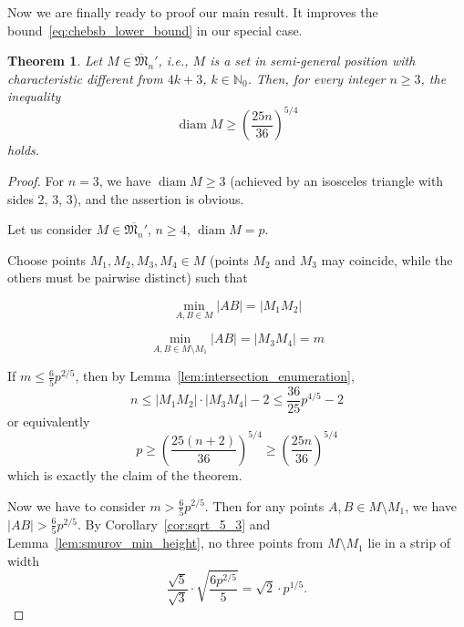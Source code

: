 \documentclass[a4paper,14pt]{article} %
\theoremstyle{plain}
\newtheorem{theorem}{Theorem}[section]
\theoremstyle{definition}
\begin{document}
Now we are finally ready to proof our main result.
It improves the bound~\eqref{eq:chebsb_lower_bound}
in our special case.

\begin{theorem}
	\label{thm:main_result}
	Let $M \in \overline{\mathfrak{M}}_n'$, i.e., $M$ is a set in semi-general position with characteristic different from $4k+3$, $k \in \mathbb{N}_0$.
	Then, for every integer $n \geq 3$, the inequality
	\begin{equation}
		\operatorname{diam} M \geq \left( \frac{25n}{36} \right)^{5/4}
	\end{equation}
	holds.
\end{theorem}

\begin{proof}
	For $n = 3$, we have $\operatorname{diam} M \geq 3$ (achieved by an isosceles triangle with sides 2, 3, 3), and the assertion is obvious.

	Let us consider $M \in \overline{\mathfrak{M}_n}'$, $n \geq 4$, $\operatorname{diam} M = p$.

	Choose points $M_1, M_2, M_3, M_4 \in M$ (points $M_2$ and $M_3$ may coincide, while the others must be pairwise distinct) such that

	\begin{equation*}
		\min_{A,B \in M} |AB| = |M_1 M_2|
	\end{equation*}

	\begin{equation*}
		\min_{A,B \in M \setminus {M_1}} |AB| = |M_3 M_4| = m
	\end{equation*}

	If $m \leq \frac{6}{5}p^{2/5}$, then by Lemma~\ref{lem:intersection_enumeration},
	\begin{equation*}
		n \leq |M_1 M_2| \cdot |M_3 M_4| - 2 \leq \frac{36}{25}p^{4/5} - 2
	\end{equation*}
	or equivalently
	\begin{equation}
		p \geq \left(\frac{25(n+2)}{36}\right)^{5/4} \geq \left(\frac{25n}{36}\right)^{5/4}
	\end{equation}
	which is exactly the claim of the theorem.

	Now we have to consider $m > \frac{6}{5}p^{2/5}$.
	Then for any points $A, B \in M \setminus {M_1}$, we have $|AB| > \frac{6}{5}p^{2/5}$.
	By Corollary~\ref{cor:sqrt_5_3} and Lemma~\ref{lem:smurov_min_height},
	no three points from $M \setminus {M_1}$ lie in a strip of width
	\begin{equation}
		\frac{\sqrt{5}}{\sqrt{3}} \cdot \sqrt{\frac{6p^{2/5}}{5}} = \sqrt{2} \cdot p^{1/5}
		.
	\end{equation}


\end{proof}
\end{document}
